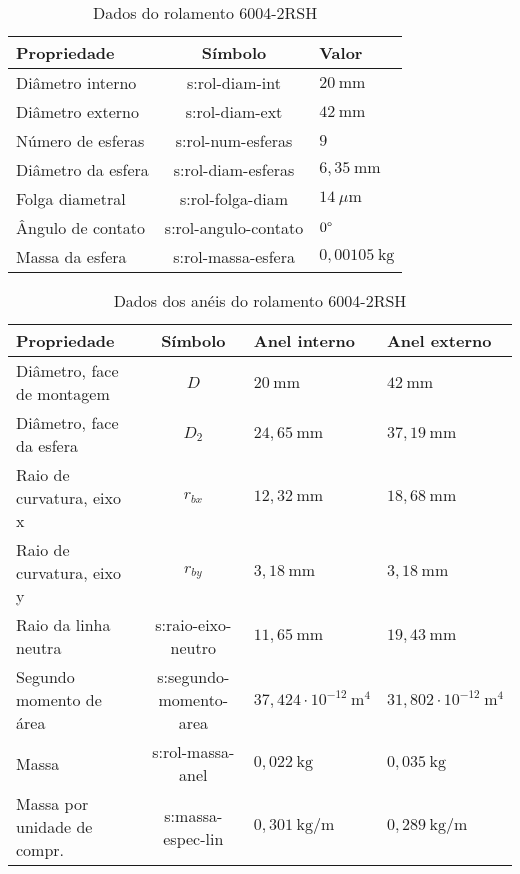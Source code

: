 \documentclass[12pt,oneside,english,brazil,lmodern,siglas,simbolos,cite=num]{ucsmonograph}
\begin{document}
	\begin{table}[t]
	\caption{Dados do rolamento 6004-2RSH}
	\def\arraystretch{1.2}
	\centering
	\begin{tabular}{l|c|l}
	\toprule
	\textbf{Propriedade} & \textbf{Símbolo} & \textbf{Valor} \\\midrule
	Diâmetro interno & \gls{s:rol-diam-int} & $20\ \text{mm}$ \\
	Diâmetro externo & \gls{s:rol-diam-ext} & $42\ \text{mm}$ \\
	Número de esferas & \gls{s:rol-num-esferas} & $ 9 $\\
	Diâmetro da esfera & \gls{s:rol-diam-esferas} & $6,35\ \text{mm}$ \\
	Folga diametral & \gls{s:rol-folga-diam} & $ 14\ \mu\text{m} $ \\
	Ângulo de contato & \gls{s:rol-angulo-contato} & $ 0\text\textdegree $ \\
	Massa da esfera & \gls{s:rol-massa-esfera} & $ 0,00105\ \text{kg} $ \\\bottomrule
	\end{tabular}
	\label{tbl:6004-gerais}
	\end{table}

	\begin{table}[b]
	\def\arraystretch{1.2}
	\caption{Dados dos anéis do rolamento 6004-2RSH}
	\begin{tabular}{l|c|l|l}
	\toprule
	\textbf{Propriedade} & \textbf{Símbolo} & \textbf{Anel interno} & \textbf{Anel externo} \\\midrule
	Diâmetro, face de montagem & $D$ & $20\ \text{mm}$ & $ 42\ \text{mm}$ \\
	Diâmetro, face da esfera & $D_2$ & $24,65\ \text{mm}$ & $37,19\ \text{mm}$ \\
	Raio de curvatura, eixo x & $r_{bx}$ & $12,32\ \text{mm}$ & $18,68\ \text{mm}$ \\
	Raio de curvatura, eixo y & $r_{by}$ & $3,18\ \text{mm}$ & $3,18\ \text{mm}$ \\
	Raio da linha neutra & \gls{s:raio-eixo-neutro} & $11,65\ \text{mm}$ & $19,43\ \text{mm}$ \\
	Segundo momento de área & \gls{s:segundo-momento-area} & $37,424\cdot 10^{-12}\ \text{m}^4$ & $31,802\cdot 10^{-12}\ \text{m}^4$ \\
	Massa & \gls{s:rol-massa-anel} & $0,022\ \text{kg}$ & $0,035\ \text{kg}$ \\
	Massa por unidade de compr. & \gls{s:massa-espec-lin} & $0,301\ \text{kg/m}$ & $0,289\ \text{kg/m}$ \\\bottomrule
	\end{tabular}
	\label{tbl:6004-aneis}
	\end{table}
\end{document}
